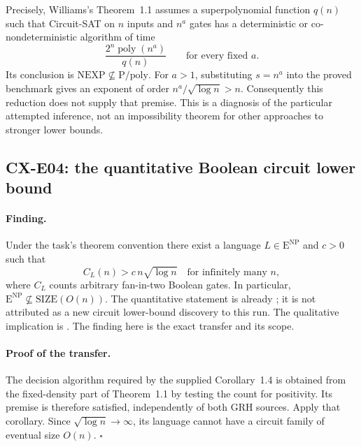 Precisely, Williams's Theorem~1.1 assumes a superpolynomial function
\(q(n)\) such that Circuit-SAT on \(n\) inputs and \(n^a\) gates
has a deterministic or co-nondeterministic algorithm of time
\[
 \frac{2^n\operatorname{poly}(n^a)}{q(n)}
 \qquad\text{for every fixed }a.
\]
Its conclusion is \(\mathrm{NEXP}\not\subseteq\mathrm{P/poly}\).
For \(a>1\), substituting \(s=n^a\) into the proved benchmark gives an
exponent of order \(n^a/\sqrt{\log n}>n\).
Consequently this reduction does not supply that premise.
This is a diagnosis of the particular attempted inference, not an
impossibility theorem for other approaches to stronger lower bounds.

\subsection{CX-E04: the quantitative Boolean circuit lower bound}
\label{finding:CX-E04}

\paragraph{Finding.}
Under the task's theorem convention there exist a language
\(L\in\mathrm E^{\mathrm{NP}}\) and \(c>0\) such that
\[
 C_L(n)>c\,n\sqrt{\log n}
 \quad\text{for infinitely many }n,
\]
where \(C_L\) counts arbitrary fan-in-two Boolean gates.
In particular,
\(\mathrm E^{\mathrm{NP}}\not\subseteq\mathrm{SIZE}(O(n))\).
The quantitative statement is already
\cite[Corollary~1.4]{OpenAIETH}; it is not attributed as a new
circuit lower-bound discovery to this run.
The qualitative implication is
\cite[Theorem~6.1]{Williams2013}.
The finding here is the exact transfer and its scope.

\paragraph{Proof of the transfer.}
The decision algorithm required by the supplied Corollary~1.4 is
obtained from the fixed-density part of Theorem~1.1 by testing the
count for positivity.
Its premise is therefore satisfied, independently of both GRH
sources. Apply that corollary.
Since \(\sqrt{\log n}\longrightarrow\infty\), its language cannot
have a circuit family of eventual size \(O(n)\).
\hfill\(\square\)

